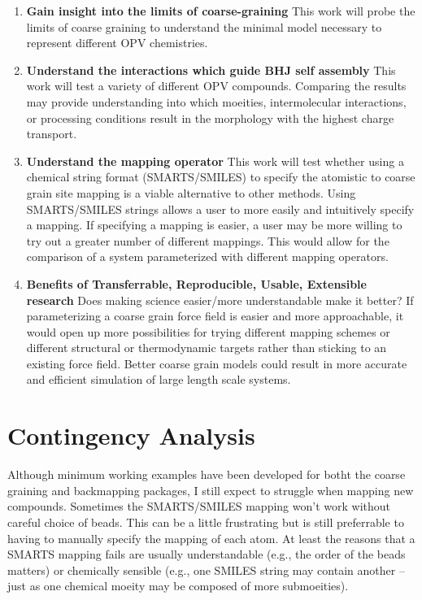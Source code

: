 \begin{enumerate}
    \item {\textbf{Gain insight into the limits of coarse-graining}}
        This work will probe the limits of coarse graining to understand the minimal model necessary to represent different OPV chemistries.
    \item {\textbf{Understand the interactions which guide BHJ self assembly}} 
        This work will test a variety of different OPV compounds. 
        Comparing the results may provide understanding into which moeities, intermolecular interactions, or processing conditions result in the morphology with the highest charge transport.
    \item {\textbf{Understand the mapping operator}}
        This work will test whether using a chemical string format (SMARTS/SMILES) to specify the atomistic to coarse grain site mapping is a viable alternative to other methods. 
        Using SMARTS/SMILES strings allows a user to more easily and intuitively specify a mapping.
        If specifying a mapping is easier, a user may be more willing to try out a greater number of different mappings.
        This would allow for the comparison of a system parameterized with different mapping operators.
    \item {\textbf{Benefits of Transferrable, Reproducible, Usable, Extensible research}} %
        Does making science easier/more understandable make it better? %
        If parameterizing a coarse grain force field is easier and more approachable, it would open up more possibilities for trying different mapping schemes or different structural or thermodynamic targets rather than sticking to an existing force field.
        Better coarse grain models could result in more accurate and efficient simulation of large length scale systems.
\end{enumerate}

\section*{Contingency Analysis}

Although minimum working examples have been developed for botht the coarse graining and backmapping packages, I still expect to struggle when mapping new compounds.
Sometimes the SMARTS/SMILES mapping won't work without careful choice of beads.
This can be a little frustrating but is still preferrable to having to manually specify the mapping of each atom.
At least the reasons that a SMARTS mapping fails are usually understandable (e.g., the order of the beads matters) or chemically sensible (e.g., one SMILES string may contain another -- just as one chemical moeity may be composed of more submoeities). %

